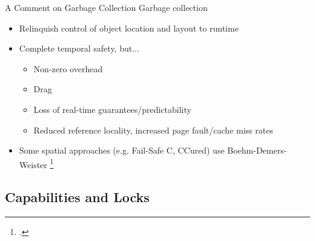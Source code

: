\documentclass[aspectratio=169]{beamer}
\begin{document}
\begin{frame}{A Comment on Garbage Collection}
Garbage collection
\pause
    \begin{itemize}[<+->]
        \item Relinquish control of object location and layout to runtime 
        \item Complete temporal safety, but...
        \begin{itemize}
            \item Non-zero overhead
            \item Drag
            \item Loss of real-time guarantees/predictability
            \item Reduced reference locality, increased page fault/cache miss rates
        \end{itemize}
        \item Some spatial approaches (e.g. Fail-Safe C, CCured) use Boehm-Demers-Weister \footcite{boehm_garbage_1988}
    \end{itemize}
\end{frame}

\subsection{Capabilities and Locks}
\end{document}
